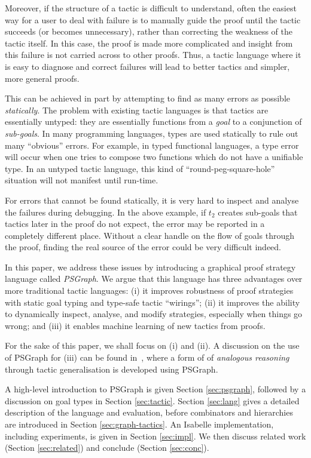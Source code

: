 \documentclass{llncs}
\begin{document}
Moreover, if the structure of a tactic is difficult to understand, often the easiest way for a user to
deal with failure is to manually guide the proof until the tactic succeeds (or becomes unnecessary), rather
than correcting the weakness of the tactic itself. In this case, the proof is made more complicated and
insight from this failure is not carried across to other proofs. Thus, a tactic language where it is easy
to diagnose and correct failures will lead to better tactics and simpler, more general proofs.

This can be achieved in part by attempting to find as many errors as possible \textit{statically}. The problem with
existing tactic languages is that tactics are essentially untyped: they are essentially functions from a \emph{goal} to
a conjunction of \emph{sub-goals}. In many programming languages, types are used statically to rule out many ``obvious''
errors. For example, in typed functional languages, a type error will occur when one tries to compose two functions
which do not have a unifiable type. In an untyped tactic language, this kind of ``round-peg-square-hole'' situation will
not manifest until run-time.

For errors that cannot be found statically, it is very hard to inspect and analyse the failures during debugging. In the
above example, if $t_2$ creates sub-goals that tactics  later in the proof do not expect, the error may be reported in a
completely different place. Without a clear handle on the flow of goals through the proof, finding the real source of
the error could be very difficult indeed.

In this paper, we address these issues by introducing a graphical proof strategy language called \emph{PSGraph}. We
argue that this language has three advantages over more traditional tactic languages: (i) it improves robustness of
proof strategies with static goal typing and type-safe tactic ``wirings''; (ii) it improves the ability to dynamically
inspect, analyse, and modify strategies, especially when things go wrong; and (iii) it enables machine learning of new tactics
from proofs.

For the sake of this paper, we shall focus on (i) and (ii). A discussion on the use of PSGraph for (iii) can be found
in~\cite{grov13a}, where a form of of \textit{analogous reasoning} through tactic generalisation is developed using
PSGraph.


A high-level introduction to PSGraph is given Section \ref{sec:psgraph}, followed by a discussion on goal types in Section \ref{sec:tactic}. Section \ref{sec:lang} gives a detailed description of the language and evaluation, before combinators and hierarchies are introduced in Section \ref{sec:graph-tactics}. An Isabelle implementation, including experiments, is given in Section \ref{sec:impl}. We then discuss related work (Section \ref{sec:related}) and conclude (Section \ref{sec:conc}).
\end{document}
